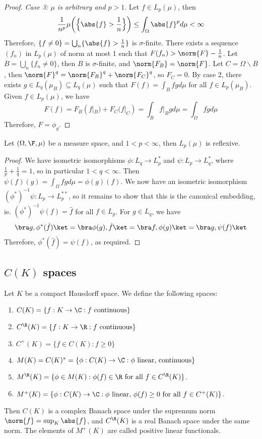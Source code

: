 \documentclass[a4paper]{article}
\begin{document}
\begin{proof}
	\emph{Case 3: $\mu$ is arbitrary and $p>1$}. Let $f\in L_p(\mu)$, then
	\[
	 \frac{1}{n^p}\mu\bigg(\Big\{\abs{f}>\frac{1}{n}\Big\}\bigg)\leq\int_\Omega\abs{f}^p d\mu<\infty
	\]
	Therefore, $\{f\not= 0\}=\bigcup_n\{\abs{f}>\frac{1}{n}\}$ is $\sigma$-finite. There exists a sequence $(f_n)$ in $L_p(\mu)$ of norm at most 1 such that $F(f_n)>\norm{F}-\frac{1}{n}$. Let $B=\bigcup_n\{f_n\not= 0\}$, then $B$ is $\sigma$-finite, and $\norm{F_B}=\norm{F}$. Let $C=\Omega\backslash B$, then $\norm{F}^q=\norm{F_B}^q+\norm{F_C}^q$, so $F_C=0$. By case 2, there exists $g\in L_q(\mu_B)\subseteq L_q(\mu)$ such that $F(f)=\int_B fg d\mu$ for all $f\in L_p(\mu_B)$. Given $f\in L_p(\mu)$, we have
	\[
	 F(f)=F_B(f|_B)+F_C(f|_C)=\int_B f|_B gd\mu=\int_\Omega fg d\mu
	\]
	Therefore, $F=\phi_g$.
\end{proof}

\begin{ncor}\label{cor:LpReflexive}
  Let $(\Omega,\F,\mu)$ be a measure space, and $1<p<\infty$, then $L_p(\mu)$ is reflexive.
\end{ncor}

\begin{proof}
  We have isometric isomorphisms $\phi:L_q\to L_p^*$ and $\psi:L_p\to L_q^*$, where $\frac{1}{p}+\frac{1}{q}=1$, so in particular $1<q<\infty$. Then $\psi(f)(g)=\int_\Omega fg d\mu=\phi(g)(f)$. We now have an isometric isomorphism $(\phi^*)^{-1}\psi:L_p\to L_p^{**}$, so it remains to show that this is the canonical embedding, ie. $(\phi^*)^{-1}\psi(f)=\hat{f}$ for all $f\in L_p$. For $g\in L_q$, we have
  \[
    \bra g,\phi^*(\hat{f})\ket=\bra\phi(g),\hat{f}\ket=\bra f,\phi(g)\ket=\bra g,\psi(f)\ket
  \]
  Therefore, $\phi^*(\hat{f})=\psi(f)$, as required.
\end{proof}

\subsection*{$C(K)$ spaces}
Let $K$ be a compact Hausdorff space. We define the following spaces:
\begin{enumerate}[label=-, nosep]
	\item $C(K)=\{f:K\to\C:f\text{ continuous}\}$
	\item $C^\R(K)=\{f:K\to\R:f\text{ continuous}\}$
	\item $C^+(K)=\{f\in C(K):f\geq 0\}$
	\item $M(K)=C(K)^*=\{\phi:C(K)\to\C:\phi\text{ linear, continuous}\}$
	\item $M^\R(K)=\{\phi\in M(K):\phi(f)\in\R\text{ for all }f\in C^\R(K)\}$.
	\item $M^+(K)=\{\phi:C(K)\to\C:\phi\text{ linear, }\phi(f)\geq 0\text{ for all }f\in C^+(K)\}$.
\end{enumerate}
Then $C(K)$ is a complex Banach space under the supremum norm $\norm{f}=\sup_K\abs{f}$, and $C^\R(K)$ is a real Banach space under the same norm. The elements of $M^+(K)$ are called positive linear functionals.
\end{document}
